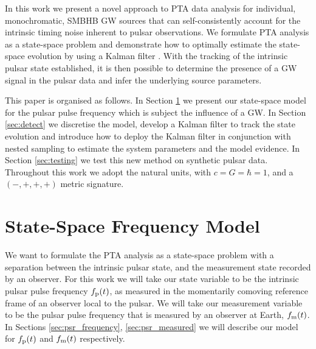 \documentclass[fleqn,usenatbib,useAMS]{mnras}
\begin{document}
In this work we present a novel approach to PTA data analysis for individual, monochromatic, SMBHB GW sources that can self-consistently account for the intrinsic timing noise inherent to pulsar observations. We formulate PTA analysis as a state-space problem and demonstrate how to optimally estimate the state-space evolution by using a Kalman filter 
\citep{Kalman1,Meyers2021,Melatos2023}.  With the tracking of the intrinsic pulsar state established, it is then possible to determine the presence of a GW signal in the pulsar data and infer the underlying source parameters. \newline 

\noindent This paper is organised as follows. In Section \ref{sec:model} we present our state-space model for the pulsar pulse frequency which is subject the influence of a GW. In Section \ref{sec:detect} we discretise the model, develop a Kalman filter to track the state evolution and introduce how to deploy the Kalman filter in conjunction with nested sampling to estimate the system parameters and the model evidence. In Section \ref{sec:testing} we test this new method on synthetic pulsar data. Throughout this work we adopt the natural units, with $c = G = \hbar = 1$, and a $(-,+,+,+)$ metric signature. \newline 






%

%
%







\section{State-Space Frequency Model}\label{sec:model}
We want to formulate the PTA analysis as a state-space problem with a separation between the intrinsic pulsar state, and the measurement state recorded by an observer. For this work we will take our state variable to be the intrinsic pulsar pulse frequency $f_{\rm p}(t)$, as measured in the momentarily comoving reference frame of an observer local to the pulsar. We will take our measurement variable to be the pulsar pulse frequency that is measured by an observer at Earth, $f_{\rm m}(t)$.  In Sections \ref{sec:psr_frequency}, \ref{sec:psr_measured} we will describe our model for $f_{\rm p}(t)$ and  $f_{\rm m}(t)$ respectively. 
\end{document}
